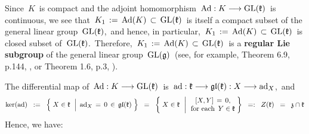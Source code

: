 \vskip 0.2cm
\noindent
Since \,$K$\, is compact and the adjoint homomorphism
\,$\textnormal{Ad} : K \longrightarrow \textnormal{GL}(\mathfrak{k})$\,
is continuous, we see that \,$K_{1} \,:=\, \textnormal{Ad}(K) \,\subset\, \textnormal{GL}(\mathfrak{k})$\,
is itself a compact subset of the general linear group \,$\textnormal{GL}(\mathfrak{k})$,\,
and hence, in particular,
\,$K_{1} \,:=\, \textnormal{Ad}(K) \,\subset\, \textnormal{GL}(\mathfrak{k})$\,
is closed subset of \,$\textnormal{GL}(\mathfrak{k})$.\,
Therefore, \,$K_{1} \,:=\, \textnormal{Ad}(K) \,\subset\, \textnormal{GL}(\mathfrak{k})$\,
is a \textbf{regular Lie subgroup} of the general linear group
\,$\textnormal{GL}(\mathfrak{g})$\,
(see, for example, Theorem 6.9, p.144, \cite{Sagle1973}, or
Theorem 1.6, p.3, \cite{Sepanski2010}).

\vskip 0.2cm
\noindent
The differential map of
\,$\textnormal{Ad} : K \longrightarrow \textnormal{GL}(\mathfrak{k})$\,
is
\,$\textnormal{ad} : \mathfrak{k} \longrightarrow \mathfrak{gl}(\mathfrak{k}) : X \longrightarrow \textnormal{ad}_{X}$,\,
and
\begin{equation*}
\ker\!\left(\ad\right)
\;\; := \;\;
    \left\{\;
        X \in \mathfrak{k}
        \;\,\left\vert\;\,
        \overset{{\color{white}.}}{\ad_{X}} \,=\, 0 \,\in\, \gl(\mathfrak{k})
        \right.
        \,\right\}
\;\; = \;\;
    \left\{\;
        X \in \mathfrak{k}
        \;\,\left\vert\,
        \begin{array}{c}
            [X,Y] \,=\, 0,
            \\
            \textnormal{for each \,$Y \in \mathfrak{k}$}
            \end{array}
        \right.
        \!\!\right\}
\;\; =: \;\;
    Z(\mathfrak{k})
\;\; = \;\;
    \mathfrak{z} \cap \mathfrak{k}
\end{equation*}
Hence, we have:
